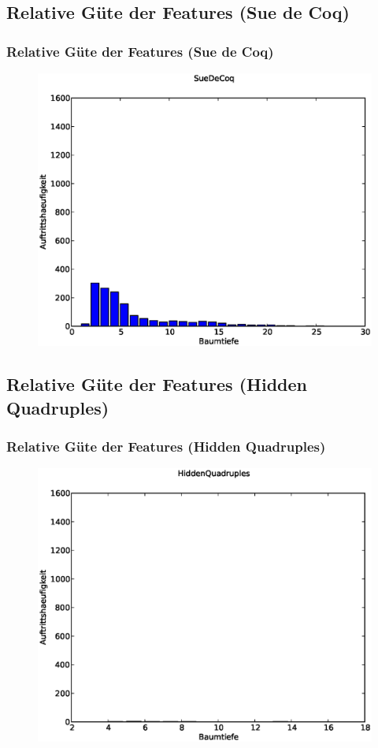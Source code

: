 \documentclass[accentcolor=tud6b,colorbacktitle,inverttitle,landscape,german,presentation,t]{tudbeamer}
\begin{document}
	\subsection{Relative Güte der Features (Sue de Coq)}
		\begin{frame}
		\frametitle{Relative Güte der Features (Sue de Coq)}
		\begin{figure}[Hh]
		\includegraphics[width=\textwidth,height=\textheight,keepaspectratio]{./img/SueDeCoq_hist.eps}
		\end{figure}
		\end{frame}

	\subsection{Relative Güte der Features (Hidden Quadruples)}
		\begin{frame}
		\frametitle{Relative Güte der Features (Hidden Quadruples)}
		\begin{figure}[Hh]
		\includegraphics[width=\textwidth,height=\textheight,keepaspectratio]{./img/HiddenQuadruples_hist.eps}
		\end{figure}
		\end{frame}
\end{document}
